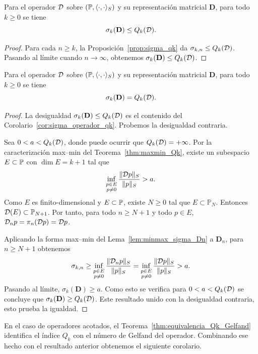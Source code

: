 \begin{cor}\label{cor:sigma_operador_qk}
	Para el operador \(\mathcal{D}\) sobre \((\mathbb{P},\langle\cdot,\cdot\rangle_S)\) y su representación matricial \(\mathbf D\), para todo \(k\ge0\) se tiene
	\[
		\sigma_k(\mathbf D)\le Q_k(\mathcal{D}).
	\]
\end{cor}

\begin{proof}
	Para cada $n\ge k$, la Proposición~\ref{prop:sigma_qk} da \(\sigma_{k,n}\le Q_k(\mathcal{D})\). Pasando al límite cuando $n\to\infty$, obtenemos \(\sigma_k(\mathbf D)\le Q_k(\mathcal{D})\).
\end{proof}

\begin{thm}\label{thm:igualdad_sigma_qk_general}
	Para el operador \(\mathcal{D}\) sobre \((\mathbb{P},\langle\cdot,\cdot\rangle_S)\) y su representación matricial \(\mathbf D\), para todo \(k\ge0\) se tiene
	\[
		\sigma_k(\mathbf D)=Q_k(\mathcal{D}).
	\]
\end{thm}

\begin{proof}
	La desigualdad \(\sigma_k(\mathbf D)\le Q_k(\mathcal{D})\) es el contenido del Corolario~\ref{cor:sigma_operador_qk}. Probemos la desigualdad contraria.

	Sea $0 <a<Q_k(\mathcal{D})$, donde puede ocurrir que $Q_k(\mathcal{D})=+\infty$. Por la caracterización max--min del Teorema~\ref{thm:maxmin_Qk}, existe un subespacio $E\subset\mathbb{P}$ con \(\dim E=k+1\) tal que
	\[
		\inf_{\substack{p\in E\\ p\ne0}}
		\frac{\|\mathcal{D} p\|_S}{\|p\|_S}>a.
	\]
	Como $E$ es finito-dimensional y $E \subset \mathbb{P}$, existe $N\ge0$ tal que \(E\subset\mathbb P_N\). Entonces \(\mathcal{D}(E)\subset\mathbb P_{N+1}\).
	Por tanto, para todo $n\ge N+1$ y todo $p\in E$, \(\mathcal D_n p=\pi_n(\mathcal{D} p)=\mathcal{D} p\).

	Aplicando la forma max--min del Lema~\ref{lem:minmax_sigma_Dn} a $\mathbf D_n$, para $n\ge N+1$ obtenemos
	\[
		\sigma_{k,n}
		\ge
		\inf_{\substack{p\in E\\ p\ne0}}
		\frac{\|\mathcal D_n p\|_S}{\|p\|_S}
		=
		\inf_{\substack{p\in E\\ p\ne0}}
		\frac{\|\mathcal{D} p\|_S}{\|p\|_S}
		>a.
	\]
	Pasando al límite, \(\sigma_k(\mathbf D)\ge a\). Como esto se verifica para $0 <a<Q_k(\mathcal{D})$ se concluye que \(\sigma_k(\mathbf D)\ge Q_k(\mathcal{D})\).
	Este resultado unido con la desigualdad contraria, esto prueba la igualdad.
\end{proof}

En el caso de operadores acotados, el Teorema~\ref{thm:equivalencia_Qk_Gelfand} identifica el índice $Q_k$ con el número de Gelfand del operador. Combinando ese hecho con el resultado anterior obtenemos el siguiente corolario.

